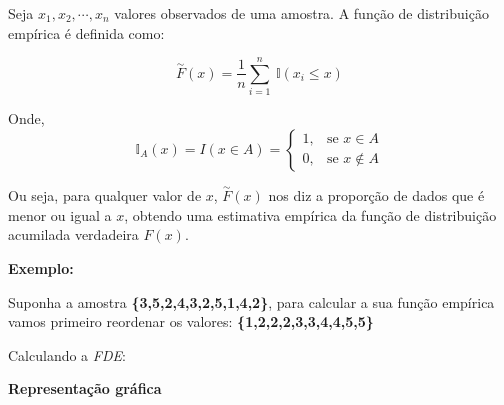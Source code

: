 \documentclass[
]{book}
\begin{document}
Seja \(x_1, x_2, \cdots, x_n\) valores observados de uma amostra. A função de distribuição empírica é definida como:

\[
\overset{\sim}{F} (x) = \frac{1}{n} \sum_{i=1}^{n}~ \mathbb{I} (x_i \leq x)
\]

Onde,
\[
 \mathbb{I}_A (x) = I(x \in A) = 
\begin{cases}
1, & \text{se } x \in A \\
0, & \text{se } x \notin A
\end{cases}
\]

Ou seja, para qualquer valor de \(x\), \(\overset{\sim}{F}(x)\) nos diz a proporção de dados que é menor ou igual a \(x\), obtendo uma estimativa empírica da função de distribuição acumilada verdadeira \(F(x)\).

\textbf{Exemplo:}

Suponha a amostra \textbf{\{3,5,2,4,3,2,5,1,4,2\}}, para calcular a sua função empírica vamos primeiro reordenar os valores:
\textbf{\{1,2,2,2,3,3,4,4,5,5\}}

Calculando a \emph{FDE}:

\begin{table}[!h]
\centering\begingroup\fontsize{8}{10}\selectfont

\endgroup{}
\end{table}

\textbf{Representação gráfica}
\end{document}

